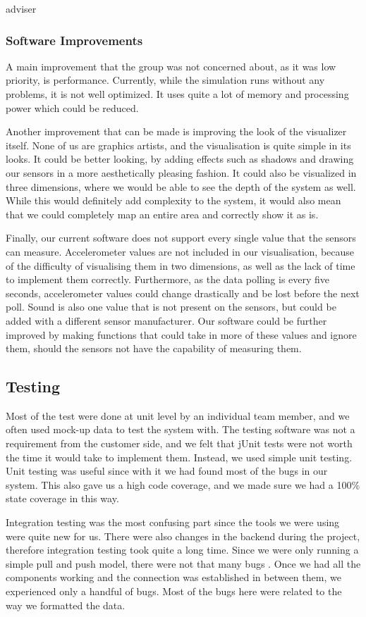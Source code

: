 adviser\documentclass[../document]{subfiles}
\begin{document}
\subsubsection{Software Improvements}
A main improvement that the group was not concerned about, as it was low priority, is performance. Currently, while the simulation runs without any problems, it is not well optimized. It uses quite a lot of memory and processing power which could be reduced.

Another improvement that can be made is improving the look of the visualizer itself. None of us are graphics artists, and the visualisation is quite simple in its looks. It could be better looking, by adding effects such as shadows and drawing our sensors in a more aesthetically pleasing fashion. It could also be visualized in three dimensions, where we would be able to see the depth of the system as well. While this would definitely add complexity to the system, it would also mean that we could completely map an entire area and correctly show it as is.

Finally, our current software does not support every single value that the sensors can measure. Accelerometer values are not included in our visualisation, because of the difficulty of visualising them in two dimensions, as well as the lack of time to implement them correctly. Furthermore, as the data polling is every five seconds, accelerometer values could change drastically and be lost before the next poll. Sound is also one value that is not present on the sensors, but could be added with a different sensor manufacturer. Our software could be further improved by making functions that could take in more of these values and ignore them, should the sensors not have the capability of measuring them.

\subsection{Testing}
Most of the test were done at unit level by an individual team member, and we often used mock-up data to test the system with. The testing software was not a requirement from the customer side, and we felt that jUnit tests were not worth the time it would take to implement them. Instead, we used simple unit testing. Unit testing was useful since with it we had found most of the bugs in our system. This also gave us a high code coverage, and we made sure we had a 100\% state coverage in this way.

Integration testing was the most confusing part since the tools we were using were quite new for us. There were also changes in the backend during the project, therefore integration testing took quite a long time. Since we were only running a simple pull and push model, there were not that many bugs . Once we had all the components working and the connection was established in between them, we experienced only a handful of bugs. Most of the bugs here were related to the way we formatted the data.
\end{document}
